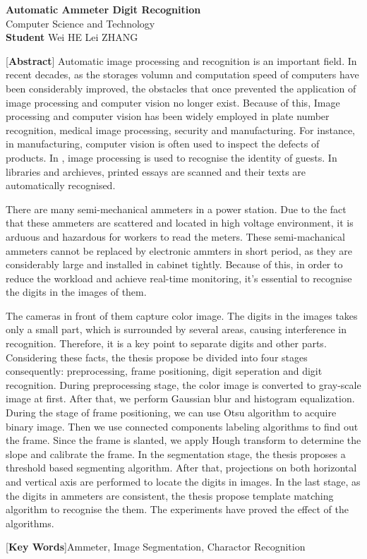 \begin{center}
\vspace*{12pt}
{\bf{}Automatic Ammeter Digit Recognition}\\[18pt]
Computer Science and Technology\\[12pt]
{\bf Student} \quad Wei HE  \quad Lei ZHANG\\[24pt]
\end{center}\par

{[{\bf Abstract}] Automatic image processing and recognition is an important field. In recent decades, as the storages volumn and computation speed of computers have been considerably improved, the obstacles that once prevented the application of image processing and computer vision no longer exist. Because of this, Image processing and computer vision has been widely employed in plate number recognition, medical image processing, security and manufacturing. For instance, in manufacturing, computer vision is often used to inspect the defects of products. In , image processing is used to recognise the identity of guests. In libraries and archieves, printed essays are scanned and their texts are automatically recognised.

There are many semi-mechanical ammeters in a power station. Due to the fact that these ammeters are scattered and located in high voltage environment, it is arduous and hazardous for workers to read the meters. These semi-machanical ammeters cannot be replaced by electronic ammters in short period, as they are considerably large and installed in cabinet tightly. Because of this, in order to reduce the workload and achieve real-time monitoring, it's essential to recognise the digits in the images of them.

The cameras in front of them capture color image. The digits in the images takes only a small part, which is surrounded by several areas, causing interference in recognition. Therefore, it is a key point to separate digits and other parts. Considering these facts, the thesis propose  be divided into four stages consequently: preprocessing, frame positioning, digit seperation and digit recognition. During preprocessing stage, the color image is converted to gray-scale image at first. After that, we perform Gaussian blur and histogram equalization. During the stage of frame positioning, we can use Otsu algorithm to acquire binary image. Then we use connected components labeling algorithms to find out the frame. Since the frame is slanted, we apply Hough transform to determine the slope and calibrate the frame. In the segmentation stage, the thesis proposes a threshold based segmenting algorithm. After that, projections on both horizontal and vertical axis are performed to locate the digits in images. In the last stage, as the digits in ammeters are consistent, the thesis propose template matching algorithm to recognise the them. The experiments have proved the effect of the algorithms.
}

\vspace{10pt}

[{\bf Key Words}]{Ammeter, Image Segmentation, Charactor Recognition}


